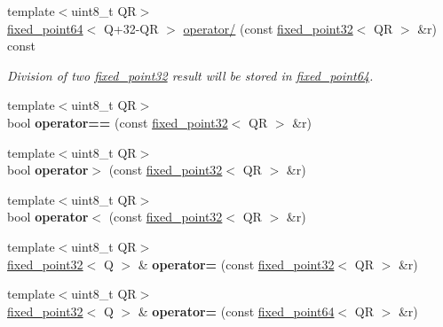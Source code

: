 \begin{DoxyCompactItemize}
{\footnotesize template$<$uint8\+\_\+t QR$>$ }\\\mbox{\hyperlink{structaacio_1_1fixed__point64}{fixed\+\_\+point64}}$<$ Q+32-\/QR $>$ \mbox{\hyperlink{group__fixedpoint_ga47eb3555482ded843d054f02bae32c3e}{operator/}} (const \mbox{\hyperlink{structaacio_1_1fixed__point32}{fixed\+\_\+point32}}$<$ QR $>$ \&r) const
\begin{DoxyCompactList}\small\item\em Division of two \mbox{\hyperlink{structaacio_1_1fixed__point32}{fixed\+\_\+point32}} result will be stored in \mbox{\hyperlink{structaacio_1_1fixed__point64}{fixed\+\_\+point64}}. \end{DoxyCompactList}\item 
\mbox{\label{structaacio_1_1fixed__point32_a3cfc3260636052c93acc053e512777b6}} 
{\footnotesize template$<$uint8\+\_\+t QR$>$ }\\bool {\bfseries operator==} (const \mbox{\hyperlink{structaacio_1_1fixed__point32}{fixed\+\_\+point32}}$<$ QR $>$ \&r)
\item 
\mbox{\label{structaacio_1_1fixed__point32_a103ab8a214ab6c0f72774d4b2aed11ae}} 
{\footnotesize template$<$uint8\+\_\+t QR$>$ }\\bool {\bfseries operator$>$} (const \mbox{\hyperlink{structaacio_1_1fixed__point32}{fixed\+\_\+point32}}$<$ QR $>$ \&r)
\item 
\mbox{\label{structaacio_1_1fixed__point32_a2f21bba7991773902150a35098310041}} 
{\footnotesize template$<$uint8\+\_\+t QR$>$ }\\bool {\bfseries operator$<$} (const \mbox{\hyperlink{structaacio_1_1fixed__point32}{fixed\+\_\+point32}}$<$ QR $>$ \&r)
\item 
{\footnotesize template$<$uint8\+\_\+t QR$>$ }\\\mbox{\hyperlink{structaacio_1_1fixed__point32}{fixed\+\_\+point32}}$<$ Q $>$ \& {\bfseries operator=} (const \mbox{\hyperlink{structaacio_1_1fixed__point32}{fixed\+\_\+point32}}$<$ QR $>$ \&r)
\item 
{\footnotesize template$<$uint8\+\_\+t QR$>$ }\\\mbox{\hyperlink{structaacio_1_1fixed__point32}{fixed\+\_\+point32}}$<$ Q $>$ \& {\bfseries operator=} (const \mbox{\hyperlink{structaacio_1_1fixed__point64}{fixed\+\_\+point64}}$<$ QR $>$ \&r)

\end{DoxyCompactItemize}
